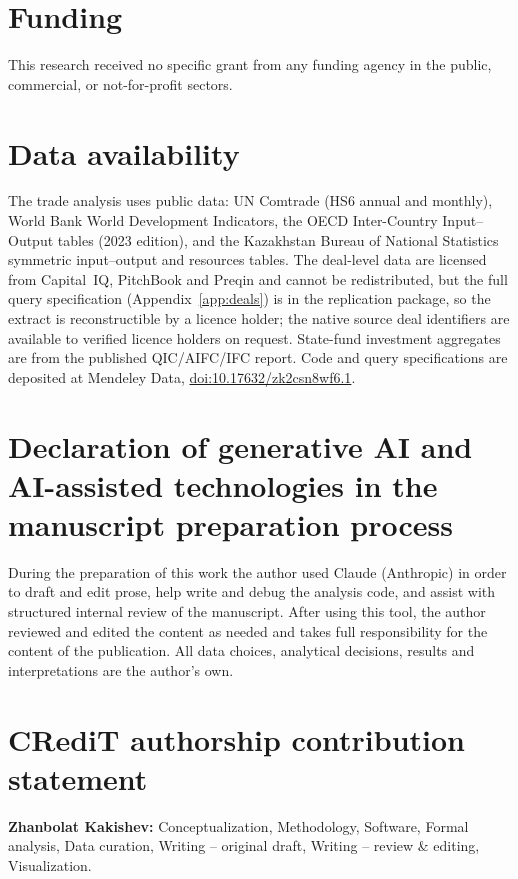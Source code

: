 \documentclass[12pt]{article}
\begin{document}
\section*{Funding}
This research received no specific grant from any funding agency in the public, commercial, or
not-for-profit sectors.

\section*{Data availability}
The trade analysis uses public data: UN Comtrade (HS6 annual and monthly), World Bank World
Development Indicators, the OECD Inter-Country Input--Output tables (2023 edition), and the
Kazakhstan Bureau of National Statistics symmetric input--output and resources tables. The
deal-level data are licensed from Capital~IQ, PitchBook and Preqin and cannot be
redistributed, but the full query specification (Appendix~\ref{app:deals}) is in the replication package, so the extract is reconstructible by a licence holder; the native source deal identifiers are available to verified licence holders on request. State-fund investment aggregates are from the published QIC/AIFC/IFC report.
Code and query specifications are deposited at Mendeley Data,
\href{https://doi.org/10.17632/zk2csn8wf6.1}{doi:10.17632/zk2csn8wf6.1}.

\section*{Declaration of generative AI and AI-assisted technologies in the manuscript preparation process}
During the preparation of this work the author used Claude (Anthropic) in order to draft and
edit prose, help write and debug the analysis code, and assist with structured internal review
of the manuscript. After using this tool, the author reviewed and edited the content as needed
and takes full responsibility for the content of the publication. All data choices, analytical
decisions, results and interpretations are the author's own.

\section*{CRediT authorship contribution statement}
\textbf{Zhanbolat Kakishev:} Conceptualization, Methodology, Software, Formal analysis, Data
curation, Writing -- original draft, Writing -- review \& editing, Visualization.



\end{document}
